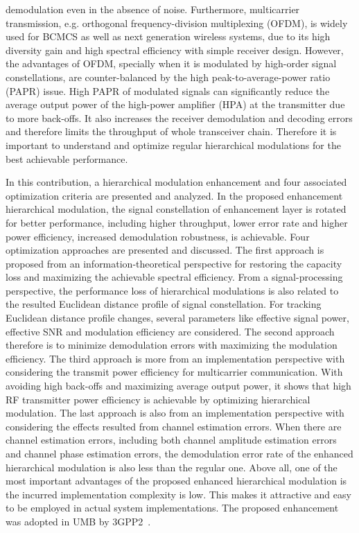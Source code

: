 \documentclass[conference]{IEEEtran}
\begin{document}
demodulation even in the absence of noise. Furthermore,
multicarrier transmission, e.g. orthogonal frequency-division
multiplexing (OFDM), is widely used for BCMCS as well as next
generation wireless systems, due to its high diversity gain and
high spectral efficiency with simple receiver design. However, the
advantages of OFDM, specially when it is modulated by high-order
signal constellations, are counter-balanced by the high
peak-to-average-power ratio (PAPR) issue. High PAPR of modulated
signals can significantly reduce the average output power of the
high-power amplifier (HPA) at the transmitter due to more
back-offs. It also increases the receiver demodulation and
decoding errors and therefore limits the throughput of whole
transceiver chain. Therefore it is important to understand and
optimize regular hierarchical modulations for the best achievable
performance.

In this contribution, a hierarchical modulation enhancement and
four associated optimization criteria are presented and analyzed.
In the proposed enhancement hierarchical modulation, the signal
constellation of enhancement layer is rotated for better
performance, including higher throughput, lower error rate and
higher power efficiency, increased demodulation robustness, is
achievable. Four optimization approaches are presented and
discussed. The first approach is proposed from an
information-theoretical perspective for restoring the capacity
loss and maximizing the achievable spectral efficiency. From a
signal-processing perspective, the performance loss of
hierarchical modulations is also related to the resulted Euclidean
distance profile of signal constellation. For tracking Euclidean
distance profile changes, several parameters like effective signal
power, effective SNR and modulation efficiency are considered. The
second approach therefore is to minimize demodulation errors with
maximizing the modulation efficiency. The third approach is more
from an implementation perspective with considering the transmit
power efficiency for multicarrier communication. With avoiding
high back-offs and maximizing average output power, it shows that
high RF transmitter power efficiency is achievable by optimizing
hierarchical modulation. The last approach is also from an
implementation perspective with considering the effects resulted
from channel estimation errors. When there are channel estimation
errors, including both channel amplitude estimation errors and
channel phase estimation errors, the demodulation error rate of
the enhanced hierarchical modulation is also less than the regular
one. Above all, one of the most important advantages of the
proposed enhanced hierarchical modulation is the incurred
implementation complexity is low. This makes it attractive and
easy to be employed in actual system implementations. The proposed
enhancement was adopted in UMB by 3GPP2~\cite{UMB}.
\end{document}
